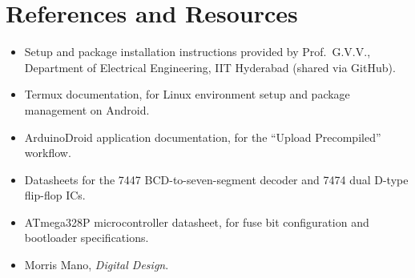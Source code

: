 \documentclass[12pt,a4paper]{report}
\begin{document}
\chapter{References and Resources}
\label{app:refs}
\begin{itemize}
    \item Setup and package installation instructions provided by Prof.\ G.V.V., Department of Electrical Engineering, IIT Hyderabad (shared via GitHub).
    \item Termux documentation, for Linux environment setup and package management on Android.
    \item ArduinoDroid application documentation, for the ``Upload Precompiled'' workflow.
    \item Datasheets for the 7447 BCD-to-seven-segment decoder and 7474 dual D-type flip-flop ICs.
    \item ATmega328P microcontroller datasheet, for fuse bit configuration and bootloader specifications.
    \item Morris Mano, \textit{Digital Design}.
\end{itemize}
\end{document}
